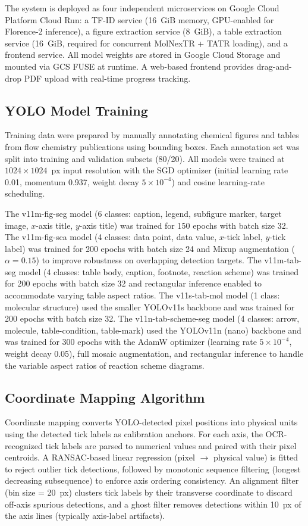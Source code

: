 \documentclass[journal=jcisd8,manuscript=article]{achemso}
\begin{document}
The system is deployed as four independent microservices on Google Cloud Platform Cloud Run: a TF-ID service (16~GiB memory, GPU-enabled for Florence-2 inference), a figure extraction service (8~GiB), a table extraction service (16~GiB, required for concurrent MolNexTR + TATR loading), and a frontend service.
All model weights are stored in Google Cloud Storage and mounted via GCS FUSE at runtime.
A web-based frontend provides drag-and-drop PDF upload with real-time progress tracking.

\subsection{YOLO Model Training}
Training data were prepared by manually annotating chemical figures and tables from flow chemistry publications using bounding boxes.
Each annotation set was split into training and validation subsets (80/20).
All models were trained at $1024 \times 1024$~px input resolution with the SGD optimizer (initial learning rate 0.01, momentum 0.937, weight decay $5 \times 10^{-4}$) and cosine learning-rate scheduling.

The v11m-fig-seg model (6 classes: caption, legend, subfigure marker, target image, $x$-axis title, $y$-axis title) was trained for 150 epochs with batch size 32.
The v11m-fig-sca model (4 classes: data point, data value, $x$-tick label, $y$-tick label) was trained for 200 epochs with batch size 24 and Mixup augmentation ($\alpha = 0.15$) to improve robustness on overlapping detection targets.
The v11m-tab-seg model (4 classes: table body, caption, footnote, reaction scheme) was trained for 200 epochs with batch size 32 and rectangular inference enabled to accommodate varying table aspect ratios.
The v11s-tab-mol model (1 class: molecular structure) used the smaller YOLOv11s backbone and was trained for 200 epochs with batch size 32.
The v11n-tab-scheme-seg model (4 classes: arrow, molecule, table-condition, table-mark) used the YOLOv11n (nano) backbone and was trained for 300 epochs with the AdamW optimizer (learning rate $5 \times 10^{-4}$, weight decay 0.05), full mosaic augmentation, and rectangular inference to handle the variable aspect ratios of reaction scheme diagrams.

\subsection{Coordinate Mapping Algorithm}
Coordinate mapping converts YOLO-detected pixel positions into physical units using the detected tick labels as calibration anchors.
For each axis, the OCR-recognized tick labels are parsed to numerical values and paired with their pixel centroids.
A RANSAC-based linear regression (pixel $\to$ physical value) is fitted to reject outlier tick detections, followed by monotonic sequence filtering (longest decreasing subsequence) to enforce axis ordering consistency.
An alignment filter (bin size = 20~px) clusters tick labels by their transverse coordinate to discard off-axis spurious detections, and a ghost filter removes detections within 10~px of the axis lines (typically axis-label artifacts).
\end{document}
